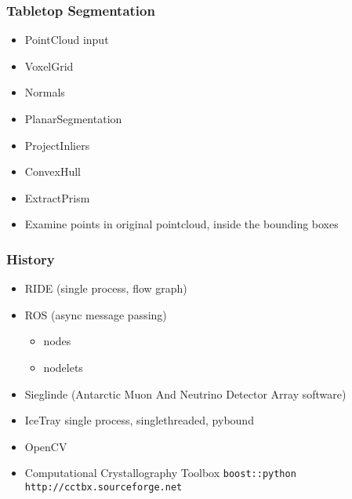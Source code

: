 \begin{frame}
   \note{ 
   }
   \titlepage
\end{frame}

\begin{frame}[fragile]
\frametitle{Tabletop Segmentation}

\begin{itemize}[<alert@+>]

\item PointCloud input

\item VoxelGrid

\item Normals

\item PlanarSegmentation

\item ProjectInliers

\item ConvexHull

\item ExtractPrism

\item Examine points in original pointcloud, inside the bounding boxes

\end{itemize}

\end{frame}

\begin{frame}[fragile]
\frametitle{History}

\begin{itemize}[<alert@+>]

\item RIDE (single process, flow graph)
\item ROS  (async message passing)
\begin{itemize}
  \item nodes
  \item nodelets
\end{itemize}
\item Sieglinde (Antarctic Muon And Neutrino Detector Array software)
\item IceTray {single process, singlethreaded, pybound}
\item OpenCV
\item Computational Crystallography Toolbox  \texttt{boost::python} \texttt{http://cctbx.sourceforge.net}
\end{itemize}
\end{frame}

